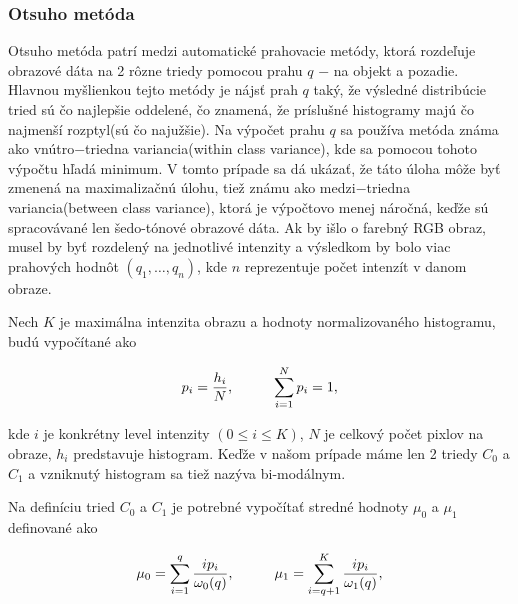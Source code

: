 \documentclass[a4paper,11pt,oneside]{article}%
\begin{document}
\subsubsection{Otsuho metóda} \label{OtsuM}
Otsuho metóda\cite{otsu} patrí medzi automatické  prahovacie metódy, ktorá rozdeľuje obrazové dáta na 2 rôzne triedy pomocou prahu $q$ $-$ na objekt a pozadie. Hlavnou myšlienkou tejto metódy je nájsť prah $q$ taký, že výsledné distribúcie tried sú čo najlepšie oddelené, čo znamená, že príslušné histogramy majú čo najmenší rozptyl(sú čo najužšie). Na výpočet prahu $q$ sa používa metóda známa ako vnútro$-$triedna variancia(within class variance), kde sa pomocou tohoto výpočtu hľadá minimum. V tomto prípade sa dá ukázať, že táto úloha môže byť zmenená na maximalizačnú úlohu, tiež známu ako medzi$-$triedna variancia(between class variance), ktorá je výpočtovo menej náročná, keďže sú spracovávané len šedo-tónové obrazové dáta. Ak by išlo o farebný RGB obraz, musel by byť rozdelený na jednotlivé intenzity a výsledkom by bolo viac prahových hodnôt $(q_1, \ldots, q_n)$, kde $n$ reprezentuje počet intenzít v danom obraze.

Nech $K$ je maximálna intenzita obrazu a hodnoty normalizovaného histogramu, budú vypočítané ako

\begin{equation}
p_i = \frac{h_i}{N}, \hspace{10mm}  \sum_{i=1}^{N} p_i = 1,
\end{equation}

kde $i$ je konkrétny level intenzity $(0 \leq i \leq K)$, $N$ je celkový počet pixlov na obraze, $h_i$ predstavuje histogram. 
Keďže v našom prípade máme len 2 triedy $C_0$ a $C_1$ a vzniknutý histogram sa tiež nazýva bi-modálnym.

Na definíciu tried $C_0$ a $C_1$ je potrebné vypočítať stredné hodnoty $\mu_0$ a $\mu_1$ definované ako

\begin{equation}
\mu_0 =  \sum_{i=1}^{q}\frac{i p_i}{\omega_0(q)}, \hspace{10mm} \mu_1 =  \sum_{i=q + 1}^{K}\frac{i p_i}{\omega_1(q)},
\end{equation}
\end{document}

